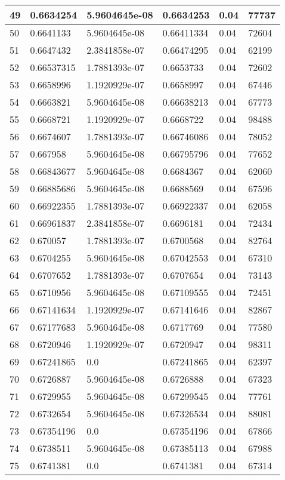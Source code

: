 \begin{longtable}{|l|l|l|l|l|l|}
49 & 0.6634254 & 5.9604645e-08 & 0.6634253 & 0.04 & 77737 \\ \hline 
50 & 0.6641133 & 5.9604645e-08 & 0.66411334 & 0.04 & 72604 \\ \hline 
51 & 0.6647432 & 2.3841858e-07 & 0.66474295 & 0.04 & 62199 \\ \hline 
52 & 0.66537315 & 1.7881393e-07 & 0.6653733 & 0.04 & 72602 \\ \hline 
53 & 0.6658996 & 1.1920929e-07 & 0.6658997 & 0.04 & 67446 \\ \hline 
54 & 0.6663821 & 5.9604645e-08 & 0.66638213 & 0.04 & 67773 \\ \hline 
55 & 0.6668721 & 1.1920929e-07 & 0.6668722 & 0.04 & 98488 \\ \hline 
56 & 0.6674607 & 1.7881393e-07 & 0.66746086 & 0.04 & 78052 \\ \hline 
57 & 0.667958 & 5.9604645e-08 & 0.66795796 & 0.04 & 77652 \\ \hline 
58 & 0.66843677 & 5.9604645e-08 & 0.6684367 & 0.04 & 62060 \\ \hline 
59 & 0.66885686 & 5.9604645e-08 & 0.6688569 & 0.04 & 67596 \\ \hline 
60 & 0.66922355 & 1.7881393e-07 & 0.66922337 & 0.04 & 62058 \\ \hline 
61 & 0.66961837 & 2.3841858e-07 & 0.6696181 & 0.04 & 72434 \\ \hline 
62 & 0.670057 & 1.7881393e-07 & 0.6700568 & 0.04 & 82764 \\ \hline 
63 & 0.6704255 & 5.9604645e-08 & 0.67042553 & 0.04 & 67310 \\ \hline 
64 & 0.6707652 & 1.7881393e-07 & 0.6707654 & 0.04 & 73143 \\ \hline 
65 & 0.6710956 & 5.9604645e-08 & 0.67109555 & 0.04 & 72451 \\ \hline 
66 & 0.67141634 & 1.1920929e-07 & 0.67141646 & 0.04 & 82867 \\ \hline 
67 & 0.67177683 & 5.9604645e-08 & 0.6717769 & 0.04 & 77580 \\ \hline 
68 & 0.6720946 & 1.1920929e-07 & 0.6720947 & 0.04 & 98311 \\ \hline 
69 & 0.67241865 & 0.0 & 0.67241865 & 0.04 & 62397 \\ \hline 
70 & 0.6726887 & 5.9604645e-08 & 0.6726888 & 0.04 & 67323 \\ \hline 
71 & 0.6729955 & 5.9604645e-08 & 0.67299545 & 0.04 & 77761 \\ \hline 
72 & 0.6732654 & 5.9604645e-08 & 0.67326534 & 0.04 & 88081 \\ \hline 
73 & 0.67354196 & 0.0 & 0.67354196 & 0.04 & 67866 \\ \hline 
74 & 0.6738511 & 5.9604645e-08 & 0.67385113 & 0.04 & 67988 \\ \hline 
75 & 0.6741381 & 0.0 & 0.6741381 & 0.04 & 67314 \\ \hline 
\end{longtable}
